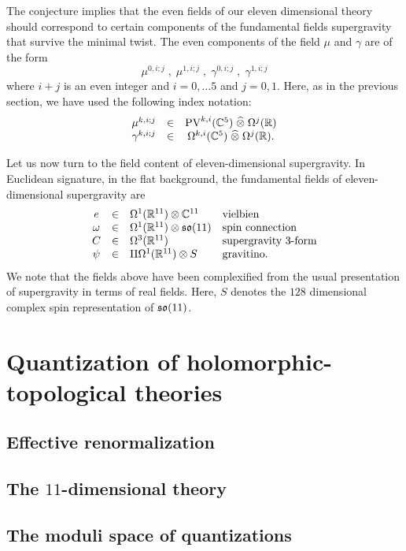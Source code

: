 \documentclass[11pt]{amsart}
\def\pv{{\rm PV}}
\begin{document}
The conjecture implies that the even fields of our eleven dimensional theory should correspond to certain components of the fundamental fields supergravity that survive the minimal twist.
The even components of the field $\mu$ and $\gamma$ are of the form
\[
  \mu^{0, i ; j} \; , \; \mu^{1, i ; j} \; , \; \gamma^{0, i ; j} \; , \; \gamma^{1, i ; j}
\]
where $i+j$ is an even integer and $i = 0,\ldots 5$ and $j=0,1$.
Here, as in the previous section, we have used the following index notation:
\[
  \begin{array}{ccccc}
    \mu^{k, i ; j} & \in & \pv^{k,i} (\CC^5) \; \Hat{\otimes} \; \Omega^j(\RR) \\
    \gamma^{k, i ; j} & \in & \Omega^{k,i}(\CC^5) \; \Hat{\otimes} \; \Omega^j(\RR).
  \end{array}
\]

Let us now turn to the field content of eleven-dimensional supergravity.
In Euclidean signature, in the flat background, the fundamental fields of eleven-dimensional supergravity are
\[
  \begin{array}{ccll}
    e & \in & \Omega^1(\mathbb R^{11}) \otimes \mathbb C^{11} & \mbox{vielbien} \\
    \omega & \in & \Omega^1(\mathbb R^{11}) \otimes \mathfrak s \mathfrak o(11) & \mbox{spin connection} \\
    C & \in & \Omega^3(\mathbb R^{11}) & \mbox{supergravity $3$-form} \\
    \psi & \in & \Pi \Omega^1(\mathbb R^{11}) \otimes S & \mbox{gravitino} .
  \end{array}
\]
We note that the fields above have been complexified from the usual presentation of supergravity in terms of real fields.
Here, $S$ denotes the $128$ dimensional complex spin representation of $\mathfrak s \mathfrak o(11)$.

\section{Quantization of holomorphic-topological theories}
\label{sec:org297a559}
\subsection{Effective renormalization}
\label{sec:orga5cd4ed}
\subsection{The \(11\)-dimensional theory}
\label{sec:org8b189fc}
\subsection{The moduli space of quantizations}
\label{sec:orgf278b4e}
\end{document}
